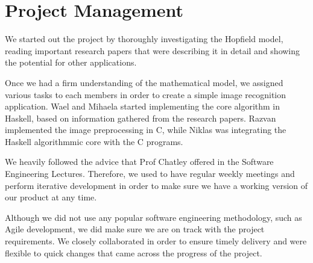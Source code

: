 \chapter{Project Management}




We started out the project by thoroughly investigating the Hopfield model, reading important research papers that were describing it in detail and showing the potential for other applications. 

Once we had a firm understanding of the mathematical model, we assigned various tasks to each members in order to create a simple image recognition application. Wael and Mihaela started implementing the core algorithm in Haskell, based on information gathered from the research papers. Razvan implemented the image preprocessing in C, while Niklas was integrating the Haskell algorithmmic core with the C programs. 

We heavily followed the advice that Prof Chatley offered in the Software Engineering Lectures. Therefore, we used to have regular weekly meetings and perform iterative development in order to make sure we have a working version of our product at any time.

Although we did not use any popular software engineering methodology, such as Agile development, we did make sure we are on track with the project requirements. We closely collaborated in order to ensure timely delivery and were flexible to quick changes that came across the progress of the project. 